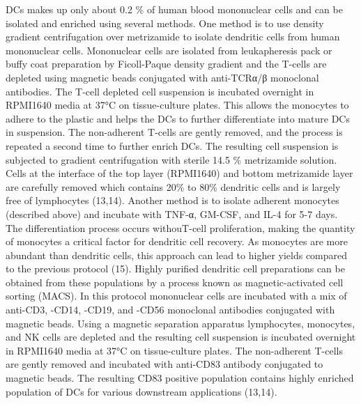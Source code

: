 \documentclass[
]{article}
\begin{document}
DCs makes up only about 0.2 \% of human blood mononuclear cells and can
be isolated and enriched using several methods. One method is to use
density gradient centrifugation over metrizamide to isolate dendritic
cells from human mononuclear cells. Mononuclear cells are isolated from
leukapheresis pack or buffy coat preparation by Ficoll-Paque density
gradient and the T-cells are depleted using magnetic beads conjugated
with anti-TCRα/β monoclonal antibodies. The T-cell depleted cell
suspension is incubated overnight in RPMI1640 media at 37°C on
tissue-culture plates. This allows the monocytes to adhere to the
plastic and helps the DCs to further differentiate into mature DCs in
suspension. The non-adherent T-cells are gently removed, and the process
is repeated a second time to further enrich DCs. The resulting cell
suspension is subjected to gradient centrifugation with sterile 14.5 \%
metrizamide solution. Cells at the interface of the top layer (RPMI1640)
and bottom metrizamide layer are carefully removed which contains 20\%
to 80\% dendritic cells and is largely free of lymphocytes (13,14).
Another method is to isolate adherent monocytes (described above) and
incubate with TNF-α, GM-CSF, and IL-4 for 5-7 days. The differentiation
process occurs withouT-cell proliferation, making the quantity of
monocytes a critical factor for dendritic cell recovery. As monocytes
are more abundant than dendritic cells, this approach can lead to higher
yields compared to the previous protocol (15). Highly purified dendritic
cell preparations can be obtained from these populations by a process
known as magnetic-activated cell sorting (MACS). In this protocol
mononuclear cells are incubated with a mix of anti-CD3, -CD14, -CD19,
and -CD56 monoclonal antibodies conjugated with magnetic beads. Using a
magnetic separation apparatus lymphocytes, monocytes, and NK cells are
depleted and the resulting cell suspension is incubated overnight in
RPMI1640 media at 37°C on tissue-culture plates. The non-adherent
T-cells are gently removed and incubated with anti-CD83 antibody
conjugated to magnetic beads. The resulting CD83 positive population
contains highly enriched population of DCs for various downstream
applications (13,14).
\end{document}
